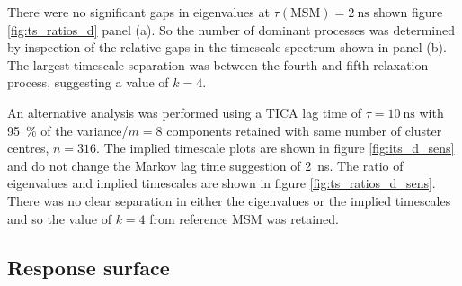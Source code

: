 There were no significant gaps in eigenvalues at $\tau(\mathrm{MSM})=\SI{2}{\nano\second}$  shown figure \ref{fig:ts_ratios_d} panel (a). So the number of dominant processes was determined by inspection of the relative gaps in the timescale spectrum shown in  panel (b). The largest timescale separation was between the fourth and fifth relaxation process, suggesting a value of $k=4$. 

An alternative analysis was performed using a TICA lag time of $\tau=\SI{10}{\nano\second}$ with \SI{95}{\percent} of the variance/$m=8$ components retained with same number of cluster centres, $n=316$. The implied timescale plots are shown in figure \ref{fig:its_d_sens} and  do not change the Markov lag time suggestion of \SI{2}{\nano\second}. The ratio of eigenvalues and implied timescales  are shown in figure \ref{fig:ts_ratios_d_sens}. There was no clear separation in either the eigenvalues or the implied timescales and so the value of $k=4$ from reference MSM was retained.

\subsection{Response surface}\label{sec:aadh_rsm}

